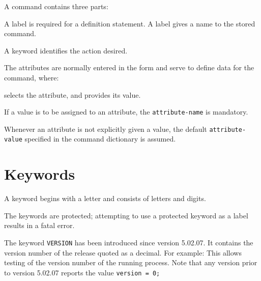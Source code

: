 A command contains three parts:
\begin{madlist}
   A label is required for a definition statement. 
   A label gives a name to the stored command.
     
   A keyword identifies the action desired.
     
   The attributes are normally entered in the
   form 
   and serve to define data for the command, where:
   \begin{madlist}
        selects the attribute, and
        provides its value.       
   \end{madlist}
\end{madlist}

If a value is to be assigned to an attribute, the \texttt{attribute-name} is
mandatory.

Whenever an attribute is not explicitly given a value, the default 
\texttt{attribute-value} specified in the command dictionary is assumed. 


\section{Keywords}
\label{subsec:keyword}

A keyword begins with a letter and consists of letters and digits. 

The \madx keywords are protected; attempting to use a protected 
keyword as a label results in a fatal error.

\begin{5.02.07}

The keyword \texttt{VERSION} has been introduced since version 5.02.07. 
It contains the version number of the \madx release quoted as a decimal.
For example:
This allows testing of the version number of the running \madx process. 
Note that any version prior to version 5.02.07 reports the value 
\texttt{version = 0;}

\end{5.02.07}


